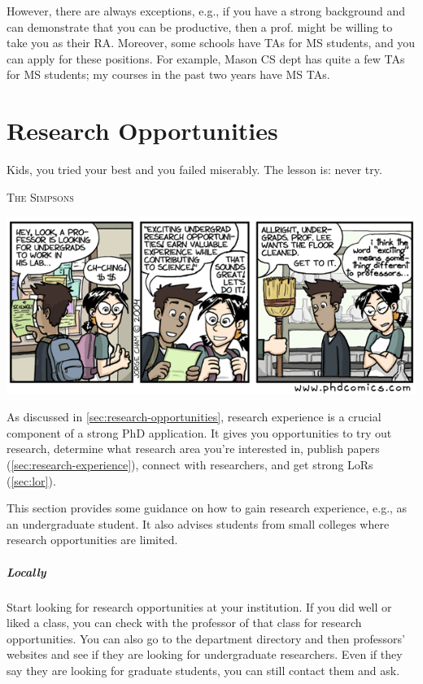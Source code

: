 \documentclass[oneside,11pt,dvipsnames]{book}
\def\chapterinfo#1{%
  \addcontentsline{toc}{chapterinfo}{%
    \noexpand\numberline{}\color{black}{#1}}%
}
\begin{document}
However, there are always exceptions, e.g., if you have a strong background and can demonstrate that you can be productive, then a prof. might be willing to take you as their RA.
Moreover, some schools have TAs for MS students, and you can apply for these positions. For example, Mason CS dept has quite a few TAs for MS students; my courses in the past two years have MS TAs.


\chapter{Research Opportunities}\label{sec:research-opportunities}
\chapterinfo{How to get research experience as an undergrad.}

\epigraph{\vspace{-0.2in} Kids, you tried your best and you failed miserably. The lesson is: never try.}{\textsc{The Simpsons}}



\begin{center}
    \includegraphics[scale=0.5]{files/phd100404s.png}
  \end{center}

As discussed in \autoref{sec:research-opportunities}, research experience is a crucial component of a strong PhD application. It gives you opportunities to try out research, determine what research area you're interested in, publish papers (\autoref{sec:research-experience}), connect with researchers, and get strong LoRs (\autoref{sec:lor}).

 This section provides some guidance on how to gain research experience, e.g., as an undergraduate student.  It also advises students from small colleges where research opportunities are limited.

\paragraph{Locally} Start looking for research opportunities at your institution.
If you did well or liked a class, you can check with the professor of that class for research opportunities.
You can also go to the department directory and then professors' websites and see if they are looking for undergraduate researchers.
Even if they say they are looking for graduate students, you can still contact them and ask.
\end{document}
